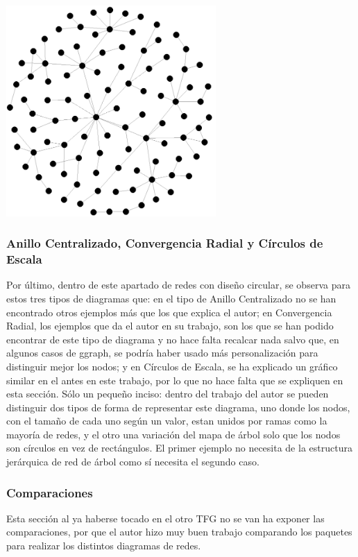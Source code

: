 \documentclass{article}\usepackage[]{graphicx}\usepackage[]{color}
\begin{document}
\vbox{
    \centering
    \includegraphics[width=0.6\textwidth]{imag/eliptica}
}
\clearpage
\subsubsection{Anillo Centralizado, Convergencia Radial y C\'irculos de Escala}
Por \'ultimo, dentro de este apartado de redes con dise\~no circular, se observa para estos tres tipos de diagramas que: en el tipo de Anillo Centralizado no se han encontrado otros ejemplos m\'as que los que explica el autor; en  Convergencia Radial, los ejemplos que da el autor en su trabajo, son los que se han podido encontrar de este tipo de diagrama y no hace falta recalcar nada salvo que, en algunos casos de ggraph, se podr\'ia haber usado m\'as personalizaci\'on para distinguir mejor los nodos; y en C\'irculos de Escala, se ha explicado un gr\'afico similar en el  
 antes en este trabajo, por lo que no hace falta que se expliquen en esta secci\'on. S\'olo un peque\~no inciso: dentro del trabajo del autor se pueden distinguir dos tipos de forma de representar este diagrama, uno donde los nodos, con el tama\~no de cada uno seg\'un un valor, estan unidos por ramas como la mayor\'ia de redes, y el otro una variaci\'on del mapa de \'arbol solo que los nodos son c\'irculos en vez de rect\'angulos. El primer ejemplo no necesita de la estructura jer\'arquica de red de \'arbol como s\'i necesita el segundo caso.
\subsubsection{Comparaciones}
Esta secci\'on al ya haberse tocado en el otro TFG no se van ha exponer las comparaciones, por que el autor hizo muy buen trabajo comparando los paquetes para realizar los distintos diagramas de redes.
\clearpage
\end{document}
